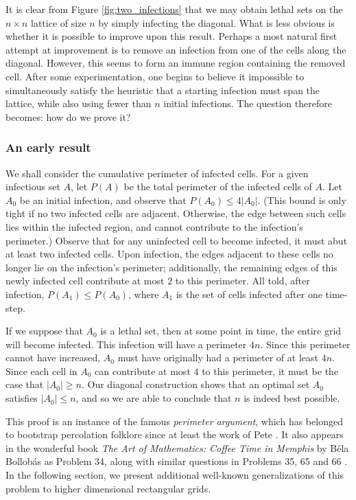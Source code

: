 It is clear from Figure \ref{fig:two_infections} that we may obtain lethal sets on the $n \times n$ lattice of size $n$ by simply infecting the diagonal. What is less obvious is whether it is possible to improve upon this result. Perhaps a most natural first attempt at improvement is to remove an infection from one of the cells along the diagonal. However, this seems to form an immune region containing the removed cell. After some experimentation, one begins to believe it impossible to simultaneously satisfy the heuristic that a starting infection must span the lattice, while also using fewer than $n$ initial infections. The question therefore becomes: how do we prove it?

\subsubsection{An early result}

We shall consider the cumulative perimeter of infected cells. For a given infectious set $A$, let $P(A)$ be the total perimeter of the infected cells of $A$. Let $A_0$ be an initial infection, and observe that $P(A_0) \leq 4 |A_0|$. (This bound is only tight if no two infected cells are adjacent. Otherwise, the edge between such cells lies within the infected region, and cannot contribute to the infection's perimeter.) Observe that for any uninfected cell to become infected, it must abut at least two infected cells. Upon infection, the edges adjacent to these cells no longer lie on the infection's perimeter; additionally, the remaining edges of this newly infected cell contribute at most $2$ to this perimeter. All told, after infection, $P(A_1) \leq P(A_0)$, where $A_1$ is the set of cells infected after one time-step.

If we suppose that $A_0$ is a lethal set, then at some point in time, the entire grid will become infected. This infection will have a perimeter $4n$. Since this perimeter cannot have increased, $A_0$ must have originally had a perimeter of at least $4n$. Since each cell in $A_0$ can contribute at most $4$ to this perimeter, it must be the case that $|A_0| \geq n$. Our diagonal construction shows that an optimal set $A_0$ satisfies $|A_0| \leq n$, and so we are able to conclude that $n$ is indeed best possible.

This proof is an instance of the famous \emph{perimeter argument}, which has belonged to bootstrap percolation folklore since at least the work of Pete \cite{pete:1997}. It also appears in the wonderful book \emph{The Art of Mathematics: Coffee Time in Memphis} by B\'ela Bollob\'as as Problem 34, along with similar questions in Problems 35, 65 and 66 \cite{bollobas2006coffee}. In the following section, we present additional well-known generalizations of this problem to higher dimensional rectangular grids.

